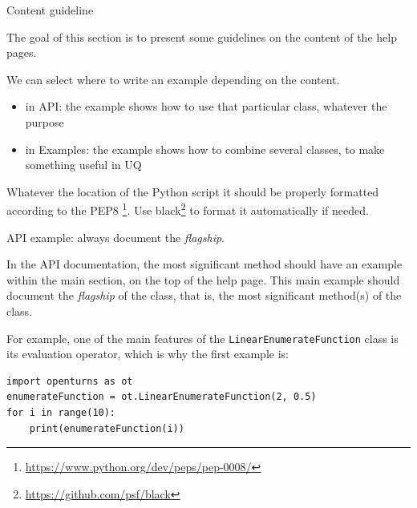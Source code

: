 \documentclass[8pt, handout]{beamer}
\begin{document}
\begin{frame}[fragile]{Content guideline}

The goal of this section is to present some guidelines on the content of 
the help pages.

We can select where to write an example depending on the content.
\begin{itemize}
\item in API: the example shows how to use that particular class, whatever the purpose
\item in Examples: the example shows how to combine several classes, to make 
something useful in UQ
\end{itemize}

Whatever the location of the Python script it should be properly 
formatted according to the PEP8 \footnote{\url{https://www.python.org/dev/peps/pep-0008/}}. 
Use black\footnote{\url{https://github.com/psf/black}} to format it automatically if 
needed. 

\end{frame}

\begin{frame}[fragile]{API example: always document the \emph{flagship}.}


In the API documentation, the most significant method should have an 
example within the main section, on the top of the help page. 
This main example should document the \emph{flagship} of the class, that is, 
the most significant method(s) of the class. 

For example, one of the main features of the \texttt{LinearEnumerateFunction} class is its 
evaluation operator, which is why the first example is:

\begin{lstlisting}
import openturns as ot
enumerateFunction = ot.LinearEnumerateFunction(2, 0.5)
for i in range(10):
    print(enumerateFunction(i))
\end{lstlisting}

\end{frame}
\end{document}
